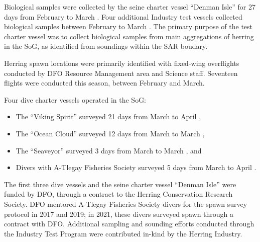 Biological samples were collected by the seine charter vessel ``Denman Isle''
for 27 days from February  to March .
Four additional Industry test vessels collected biological samples
between February  to March .
The primary purpose of the test charter vessel was to
collect biological samples from main aggregations of herring in the SoG,
as identified from soundings within the SAR boudary. 

Herring spawn locations were primarily identified with fixed-wing overflights
conducted by DFO Resource Management area and Science staff.
Seventeen flights were conducted this season, between February and March.

Four dive charter vessels operated in the SoG:
\begin{itemize}
\item The ``Viking Spirit'' surveyed 21 days from March  to April ,
\item The ``Ocean Cloud'' surveyed 12 days from March  to March ,
\item The ``Seaveyor'' surveyed 3 days from March  to March , and
\item Divers with A-Tlegay Fisheries Society surveyed 5 days from March  to April .
\end{itemize}
The first three dive vessels and the seine charter vessel ``Denman Isle''
were funded by DFO, through a contract to the Herring Conservation Research Society.
DFO mentored A-Tlegay Fisheries Society divers for the spawn survey protocol in 2017 and 2019;
in 2021, these divers surveyed spawn through a contract with DFO.
Additional sampling and sounding efforts conducted through the
Industry Test Program were contributed in-kind by the Herring Industry.
